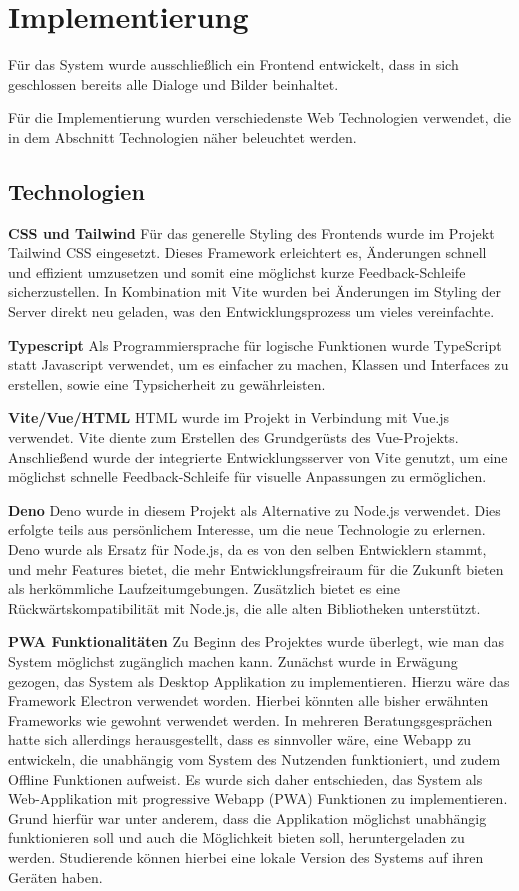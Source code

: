 \chapter{Implementierung}
\label{chap:implementation}
Für das System wurde ausschließlich ein Frontend entwickelt, dass in sich geschlossen bereits alle Dialoge und Bilder beinhaltet.

Für die Implementierung wurden verschiedenste Web Technologien verwendet, die in dem Abschnitt Technologien näher beleuchtet werden.

\section{Technologien}
\begin{description}
    \item \textbf{CSS und Tailwind} Für das generelle Styling des Frontends wurde im Projekt Tailwind CSS eingesetzt. Dieses Framework erleichtert es, Änderungen schnell und effizient umzusetzen und somit eine möglichst kurze Feedback-Schleife sicherzustellen. In Kombination mit Vite wurden bei Änderungen im Styling der Server direkt neu geladen, was den Entwicklungsprozess um vieles vereinfachte.
    \item \textbf{Typescript} Als Programmiersprache für logische Funktionen wurde TypeScript statt Javascript verwendet, um es einfacher zu machen, Klassen und Interfaces zu erstellen, sowie eine Typsicherheit zu gewährleisten.
    \item \textbf{Vite/Vue/HTML} HTML wurde im Projekt in Verbindung mit Vue.js verwendet. Vite diente zum Erstellen des Grundgerüsts des Vue-Projekts. Anschließend wurde der integrierte Entwicklungsserver von Vite genutzt, um eine möglichst schnelle Feedback-Schleife für visuelle Anpassungen zu ermöglichen.
    \item \textbf{Deno} Deno wurde in diesem Projekt als Alternative zu Node.js verwendet. Dies erfolgte teils aus persönlichem Interesse, um die neue Technologie zu erlernen. Deno wurde als Ersatz für Node.js, da es von den selben Entwicklern stammt, und mehr Features bietet, die mehr Entwicklungsfreiraum für die Zukunft bieten als herkömmliche Laufzeitumgebungen. Zusätzlich bietet es eine Rückwärtskompatibilität mit Node.js, die alle alten Bibliotheken unterstützt.
    \item \textbf{PWA Funktionalitäten} Zu Beginn des Projektes wurde überlegt, wie man das System möglichst zugänglich machen kann. Zunächst wurde in Erwägung gezogen, das System als Desktop Applikation zu implementieren. Hierzu wäre das Framework Electron verwendet worden. Hierbei könnten alle bisher erwähnten Frameworks wie gewohnt verwendet werden. In mehreren Beratungsgesprächen hatte sich allerdings herausgestellt, dass es sinnvoller wäre, eine Webapp zu entwickeln, die unabhängig vom System des Nutzenden funktioniert, und zudem Offline Funktionen aufweist. Es wurde sich daher entschieden, das System als Web-Applikation mit progressive Webapp (PWA) Funktionen zu implementieren. Grund hierfür war unter anderem, dass die Applikation möglichst unabhängig funktionieren soll und auch die Möglichkeit bieten soll, heruntergeladen zu werden. Studierende können hierbei eine lokale Version des Systems auf ihren Geräten haben.

\end{description}
